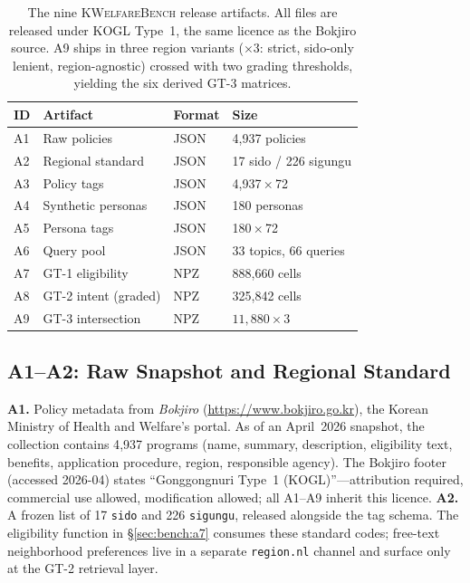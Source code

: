 \documentclass{article}
\newcommand{\kwbench}{\textsc{KWelfareBench}}
\newcommand{\npolicy}{4{,}937}
\newcommand{\npersona}{180}
\begin{document}
\begin{table}[t]
\centering
\footnotesize
\setlength{\tabcolsep}{4pt}
\begin{tabular}{llll}
\toprule
ID & Artifact & Format & Size \\
\midrule
A1 & Raw policies         & JSON & \npolicy{} policies \\
A2 & Regional standard    & JSON & 17 sido / 226 sigungu \\
A3 & Policy tags          & JSON & \npolicy{}\,$\times$\,72 \\
A4 & Synthetic personas   & JSON & \npersona{} personas \\
A5 & Persona tags         & JSON & \npersona{}\,$\times$\,72 \\
A6 & Query pool           & JSON & 33 topics, 66 queries \\
A7 & GT-1 eligibility     & NPZ  & 888{,}660 cells \\
A8 & GT-2 intent (graded) & NPZ  & 325{,}842 cells \\
A9 & GT-3 intersection    & NPZ  & $11{,}880\!\times\!3$ \\
\bottomrule
\end{tabular}
\caption{The nine \kwbench{} release artifacts. All files are
released under KOGL Type~1, the same licence as the Bokjiro source.
A9 ships in three region variants ($\times{}3$: strict, sido-only
lenient, region-agnostic) crossed with two grading thresholds,
yielding the six derived GT-3 matrices.}
\label{tab:bench_artifacts}
\end{table}

\subsection{A1--A2: Raw Snapshot and Regional Standard}
\label{sec:bench:a1}
\label{sec:bench:a2}

\textbf{A1.} Policy metadata from \emph{Bokjiro}
(\url{https://www.bokjiro.go.kr}), the Korean Ministry of Health and
Welfare's portal. As of an April~2026 snapshot, the collection
contains \npolicy{} programs (name, summary, description, eligibility
text, benefits, application procedure, region, responsible agency).
The Bokjiro footer (accessed 2026-04) states ``Gonggongnuri Type~1
(KOGL)''---attribution required, commercial use allowed, modification
allowed; all A1--A9 inherit this licence.
\textbf{A2.} A frozen list of 17 \texttt{sido} and 226
\texttt{sigungu}, released alongside the tag schema. The eligibility
function in \S\ref{sec:bench:a7} consumes these standard codes;
free-text neighborhood preferences live in a separate
\texttt{region.nl} channel and surface only at the GT-2 retrieval
layer.
\end{document}
